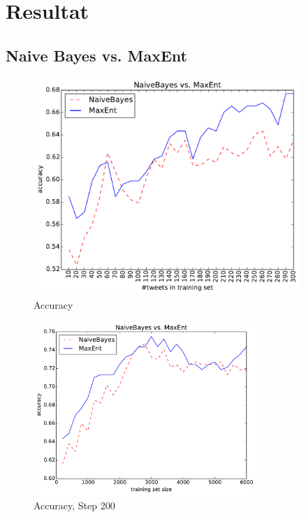 \documentclass[12pt, oneside]{report}   	%
\begin{document}
\chapter{Resultat}

\section{Naive Bayes vs. MaxEnt}

\begin{figure}[htbp]
\begin{center}
\includegraphics[width=0.9\textwidth]{bilder/cmp_nb_vs_me_S10_M300-16M.pdf}
\caption{Accuracy}
\label{img:acc}
\end{center}
\end{figure}

\begin{figure}[htbp]
\begin{center}
\includegraphics[width=0.75\textwidth]{bilder/cmp_nb_vs_me_S200_M6000.pdf}
\caption{Accuracy, Step 200}
\label{img:acc2}
\end{center}
\end{figure}
\end{document}
